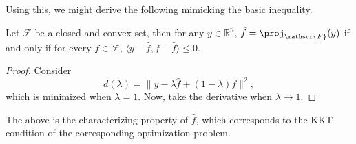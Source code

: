 Using this, we might derive the following mimicking the \hyperref[eq:basic-inequality]{basic inequality}.

\begin{lemma}\label{lma:obtuse-angle}
	Let \(\mathscr{F} \) be a closed and convex set, then for any \(y\in \mathbb{R} ^n\), \(\hat{f} = \proj_{\mathscr{F} }(y) \) if and only if for every \(f\in \mathscr{F} \), \(\langle y - \hat{f} , f - \hat{f} \rangle \leq 0\).
\end{lemma}
\begin{proof}
	Consider
	\[
		d(\lambda ) = \lVert y - \lambda \hat{f} + (1 - \lambda )f \rVert ^2,
	\]
	which is minimized when \(\lambda = 1\). Now, take the derivative when \(\lambda \to 1\).
\end{proof}

\begin{center}
\end{center}

\begin{remark}
	The above is the characterizing property of \(\hat{f} \), which corresponds to the KKT condition of the corresponding optimization problem.
\end{remark}

